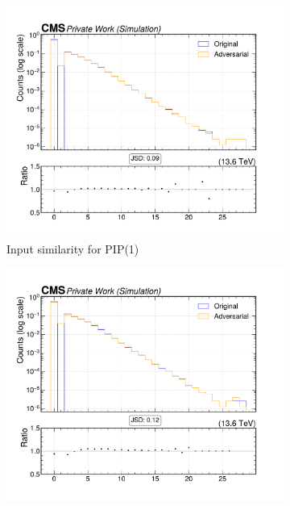 \begin{figure}[htbp]
  \centering
  \begin{subfigure}[t]{0.32\textwidth}
    \includegraphics[width=\linewidth]{media/output/features/compare/intprob_1/cmp_global_features_TagVarCSV_jetNTracksEtaRel.pdf}
    \caption{Input similarity for PIP(1)}
  \end{subfigure}\hfill
  \begin{subfigure}[t]{0.32\textwidth}
    \includegraphics[width=\linewidth]{media/output/features/compare/intprob_2/cmp_global_features_TagVarCSV_jetNTracksEtaRel.pdf}

\end{subfigure}
\end{figure}
